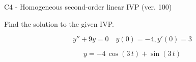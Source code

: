 \begin{exercise}
  \begin{exerciseTitle}C4 - Homogeneous second-order linear IVP (ver. 100)\end{exerciseTitle}
  \begin{exerciseStatement}
    
Find the solution to the given IVP.

    
\[y''+9y = 0 \hspace{1em} y(0) = -4 , y'(0) = 3\]

  \end{exerciseStatement}
  \begin{exerciseAnswer}
    
\[y= -4 \, \cos\left(3 \, t\right) + \sin\left(3 \, t\right)\]

  \end{exerciseAnswer}
\end{exercise}